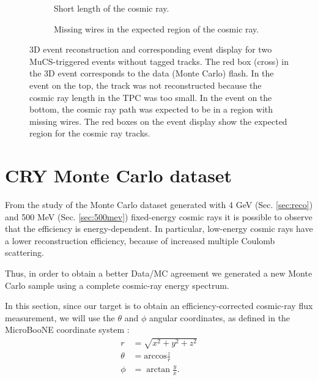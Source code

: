 \documentclass[a4paper]{scrartcl}
\begin{document}
\begin{figure}[htbp]
\begin{subfigure}{1\textwidth}
\begin{center}

\end{center}
\caption{Short length of the cosmic ray.}\label{fig:short}
\vspace{1em}
\end{subfigure}
\begin{subfigure}{1\textwidth}
\begin{center}
\caption{Missing wires in the expected region of the cosmic ray.}\label{fig:wire}
\end{center}
\end{subfigure}
\caption{3D event reconstruction and corresponding event display for two MuCS-triggered events without tagged tracks. The red box (cross) in the 3D event corresponds to the data (Monte Carlo) flash. In the event on the top, the track was not reconstructed because the cosmic ray length in the TPC was too small. In the event on the bottom, the cosmic ray path was expected to be in a region with missing wires. The red boxes on the event display show the expected region for the cosmic ray tracks.} \label{fig:ineff}
\end{figure}
\clearpage{}


\section{CRY Monte Carlo dataset}\label{sec:cry}
From the study of the Monte Carlo dataset generated with 4 GeV (Sec. \ref{sec:reco}) and 500 MeV (Sec. \ref{sec:500mev}) fixed-energy cosmic rays it is possible to observe that the efficiency is energy-dependent. In particular, low-energy cosmic rays have a lower reconstruction efficiency, because of increased multiple Coulomb scattering.

Thus, in order to obtain a better Data/MC agreement we generated a new Monte Carlo sample using a complete cosmic-ray energy spectrum.

In this section, since our target is to obtain an efficiency-corrected cosmic-ray flux measurement, we will use the $\theta$ and $\phi$ angular coordinates, as defined in the MicroBooNE coordinate system \cite{datamc}:
\begin{equation}
\begin{aligned}
r &= \sqrt{x^2+y^2+z^2}\\
\theta &= \mathrm{arccos}\frac{z}{r}\\
\phi &= \arctan \frac{y}{x}.
\end{aligned}
\end{equation}
\end{document}
